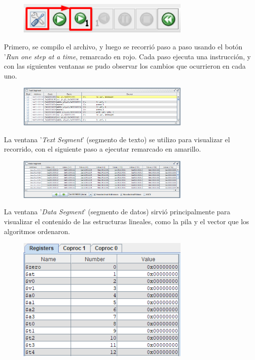 \documentclass[titlepage]{article}
\begin{document}
\begin{figure}[h]
    \centering
    \includegraphics[width=0.75\textwidth]{images/step1.png} %
    \label{fig:step1}
\end{figure}

Primero, se compilo el archivo, y luego se recorrió paso a paso usando el botón '\emph{Run one step at a time}, remarcado en rojo. Cada paso ejecuta una instrucción, y con las siguientes ventanas se pudo observar los cambios que ocurrieron en cada uno.

\begin{figure}[h]
    \centering
    \includegraphics[width=0.75\textwidth]{images/step2.png} %
    \label{fig:step1}
\end{figure}

La ventana '\emph{Text Segment}' (segmento de texto) se utilizo para visualizar el recorrido, con el siguiente paso a ejecutar remarcado en amarillo.

\begin{figure}[h]
    \centering
    \includegraphics[width=0.75\textwidth]{images/step3.png} %
    \label{fig:step1}
\end{figure}

La ventana '\emph{Data Segment}' (segmento de datos) sirvió principalmente para visualizar el contenido de las estructuras lineales, como la pila y el vector que los algoritmos ordenaron.

\begin{figure}[h]
    \centering
    \includegraphics[width=0.75\textwidth]{images/step4.png} %
    \label{fig:step1}
\end{figure}
\end{document}
